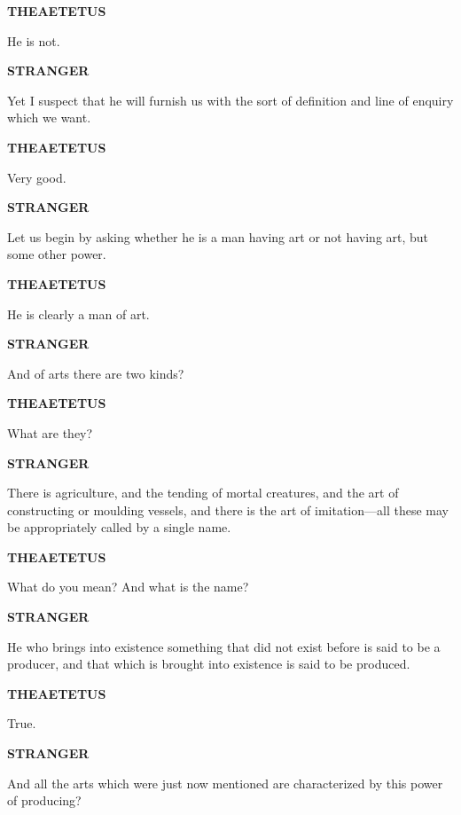 \documentclass[11pt,letter]{article}
\begin{document}
\par \textbf{THEAETETUS}
\par   He is not.

\par \textbf{STRANGER}
\par   Yet I suspect that he will furnish us with the sort of definition and line of enquiry which we want.

\par \textbf{THEAETETUS}
\par   Very good.

\par \textbf{STRANGER}
\par   Let us begin by asking whether he is a man having art or not having art, but some other power.

\par \textbf{THEAETETUS}
\par   He is clearly a man of art.

\par \textbf{STRANGER}
\par   And of arts there are two kinds?

\par \textbf{THEAETETUS}
\par   What are they?

\par \textbf{STRANGER}
\par   There is agriculture, and the tending of mortal creatures, and the art of constructing or moulding vessels, and there is the art of imitation—all these may be appropriately called by a single name.

\par \textbf{THEAETETUS}
\par   What do you mean? And what is the name?

\par \textbf{STRANGER}
\par   He who brings into existence something that did not exist before is said to be a producer, and that which is brought into existence is said to be produced.

\par \textbf{THEAETETUS}
\par   True.

\par \textbf{STRANGER}
\par   And all the arts which were just now mentioned are characterized by this power of producing?
\end{document}
